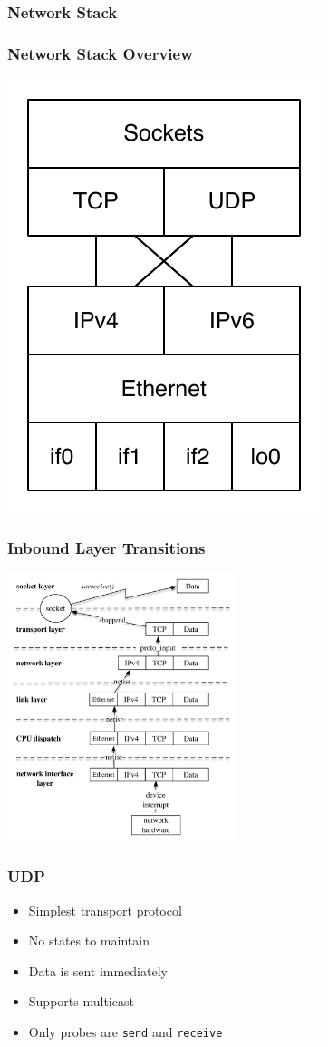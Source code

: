 \begin{frame}
  \frametitle{Network Stack}
\end{frame}

\begin{frame}
  \frametitle{Network Stack Overview}
\centering
\includegraphics{../figures/tcpipstack}
\end{frame}

\begin{frame}
\centering
  \frametitle{Inbound Layer Transitions}
\includegraphics[width=0.5\textwidth]{../figures/inbound}
\end{frame}

\begin{frame}[fragile]
  \frametitle{UDP}
  \begin{itemize}
  \item Simplest transport protocol
  \item No states to maintain
  \item Data is sent immediately
  \item Supports multicast
  \item Only probes are \verb+send+ and \verb+receive+
  \end{itemize}
\end{frame}

